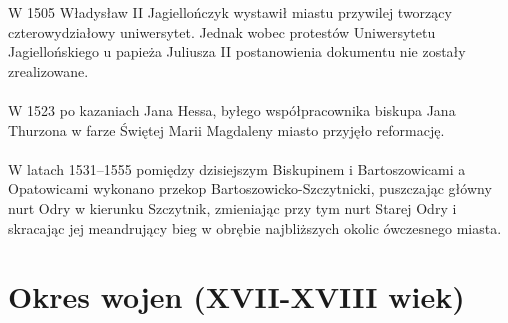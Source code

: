 \documentclass[12pt]{article}
\begin{document}
W 1505 Władysław II Jagiellończyk wystawił miastu przywilej tworzący czterowydziałowy uniwersytet. Jednak wobec protestów Uniwersytetu Jagiellońskiego u papieża Juliusza II postanowienia dokumentu nie zostały zrealizowane.\\\\
W 1523 po kazaniach Jana Hessa, byłego współpracownika biskupa Jana Thurzona w farze Świętej Marii Magdaleny miasto przyjęło reformację.\\\\
W latach 1531–1555 pomiędzy dzisiejszym Biskupinem i Bartoszowicami a Opatowicami wykonano przekop Bartoszowicko-Szczytnicki, puszczając główny nurt Odry w kierunku Szczytnik, zmieniając przy tym nurt Starej Odry i skracając jej meandrujący bieg w obrębie najbliższych okolic ówczesnego miasta.

\section{Okres wojen (XVII-XVIII wiek)}
\end{document}
